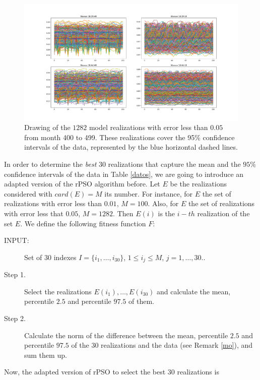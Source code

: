 \begin{figure}[h!]
	\centering
	\includegraphics[width=\linewidth]{IMGs/1.-Calibrado/Error_005.pdf}
	\caption{Drawing of the $1282$ model realizations with error less than $0.05$ from month 400 to 499. These realizations cover the 95\% confidence intervals of the data, represented by the blue horizontal dashed lines.}
	\label{Error_003}
\end{figure}

In order to determine the \textit{best} $30$ realizations that capture the mean and the $95\%$ confidence intervals of the data in Table \ref{datos}, we are going to introduce an adapted version of the rPSO algorithm before. Let $E$ be the realizations considered with $card(E)=M$ its number. For instance, for $E$ the set of realizations with error less than $0.01$, $M=100$. Also, for $E$ the set of realizations with error less that $0.05$, $M=1282$. Then $E(i)$ is the $i-th$ realization of the set $E$. We define the following fitness function $F$:

\begin{description}
	\item[INPUT:] Set of $30$ indexes $I=\{i_1,\ldots,i_{30} \}$, $1\leq i_j \leq M$, $j=1,\ldots, 30$..
	\item[Step 1.] Select the realizations $E(i_1),\ldots,E(i_{30})$ and calculate the mean, percentile $2.5$ and percentile $97.5$ of them.
	\item[Step 2.] Calculate the norm of the difference between the mean, percentile $2.5$ and percentile $97.5$  of the $30$ realizations and the data (see Remark \ref{mo}), and sum them up. 
\end{description}

Now, the adapted version of rPSO to select the best $30$ realizations is

